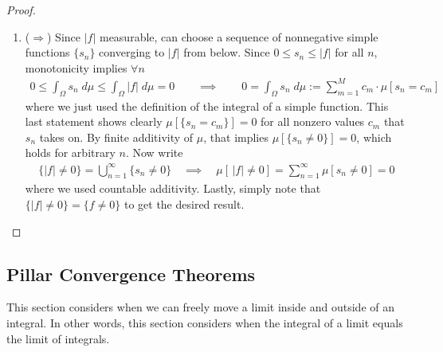 \documentclass[12pt]{article}
\theoremstyle{plain}
\theoremstyle{definition}
\theoremstyle{remark}
\newcommand{\sumninf}{\sum^\infty_{n=1}}
\begin{document}
\begin{proof}
\begin{enumerate}[label=(\roman*)]
  \item
    ($\Rightarrow$)
    Since $|f|$ measurable, can choose a sequence of nonnegative simple
    functions $\{s_n\}$ converging to $|f|$ from below. Since
    $0\leq s_n\leq |f|$ for all $n$, monotonicity implies $\forall n$
    \begin{align*}
      0 \leq \int_\Omega s_n \;d\mu\leq \int_\Omega |f|\;d\mu = 0
      \qquad\implies\qquad
      0 = \int_\Omega s_n\;d\mu
      := \sum^M_{m=1} c_m \cdot \mu[s_n=c_m ]
    \end{align*}
    where we just used the definition of the integral of a simple
    function.
    This last statement shows clearly
    $\mu[\{s_n=c_m\}]=0$ for all nonzero values $c_m$ that $s_n$
    takes on. By finite additivity of $\mu$, that implies
    $\mu[\{s_n\neq 0\}]=0$, which holds for arbitrary $n$.
    Now write
    \begin{align*}
      \big\{|f|\neq 0\big\} =
      \bigcup^\infty_{n=1} \{s_n\neq0\}
      \quad\implies\quad
      \mu\left[\,|f|\neq 0 \right]=
      \sumninf \mu\left[s_n\neq 0\right]
      = 0
    \end{align*}
    where we used countable additivity.
    Lastly, simply note that $\{|f|\neq 0\}=\{f\neq 0\}$ to get the
    desired result.

\end{enumerate}
\end{proof}


\clearpage
\subsection{Pillar Convergence Theorems}

This section considers when we can freely move a limit inside and
outside of an integral. In other words, this section considers when the
integral of a limit equals the limit of integrals.
\end{document}

